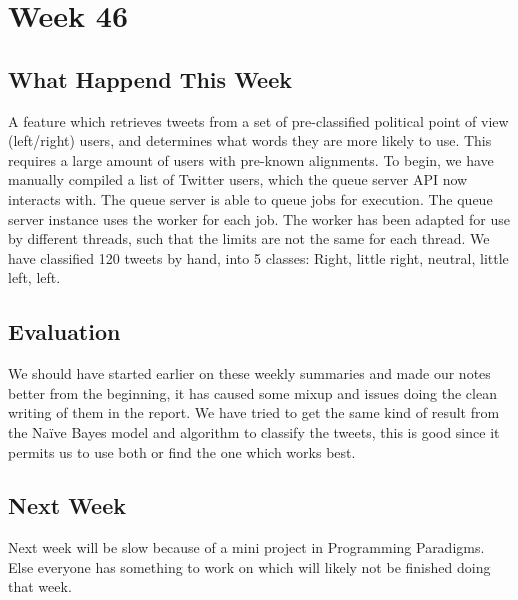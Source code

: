 \section*{Week 46} \subsection*{What Happend This Week} 
A feature which retrieves tweets from a set of pre-classified political point of
view (left/right) users, and determines what words they are more likely to use.
This requires a large amount of users with pre-known alignments. To begin, we
have manually compiled a list of Twitter users, which the queue server \ac{API}
now interacts with. The queue server is able to queue jobs for execution. The
queue server instance uses the worker for each job. The worker has been adapted
for use by different threads, such that the limits are not the same for each
thread. We have classified 120 tweets by hand, into 5 classes: Right, little
right, neutral, little left, left.


\subsection*{Evaluation} 
We should have started earlier on these weekly summaries and made our notes
better from the beginning, it has caused some mixup and issues doing the clean
writing of them in the report. We have tried to get the same kind of result from
the Naïve Bayes model and algorithm to classify the tweets, this is good since
it permits us to use both or find the one which works best.


\subsection*{Next Week} 
Next week will be slow because of a mini project in Programming Paradigms. Else
everyone has something to work on which will likely not be finished doing that
week.



